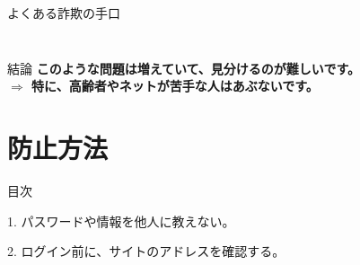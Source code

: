 \documentclass[xcolor=dvipsnames, aspectratio=1610]{beamer}
\begin{document}
\begin{frame}[t]{よくある詐欺の手口}
\begin{columns}
\begin{column}{0.5\textwidth}
\begin{figure}[h]
            \end{figure}
        \end{column}
    \end{columns}
\end{frame}
\begin{frame}{結論}
    \LARGE
    \textbf{このような問題は増えていて、見分けるのが難しいです。} \\
    \vspace{0.5cm}
    \textbf{\alert{$\Rightarrow$ 特に、高齢者やネットが苦手な人はあぶないです。}}
\end{frame}

\section{防止方法}
\begin{frame}{目次}
\end{frame}
\begin{frame}{1. パスワードや情報を他人に教えない。}
    \begin{figure}[h]
        \centering
    \end{figure}
\end{frame}
\begin{frame}{2. ログイン前に、サイトのアドレスを確認する。}
    \begin{figure}[h]
        \centering
    \end{figure}
\end{frame}
\end{document}
